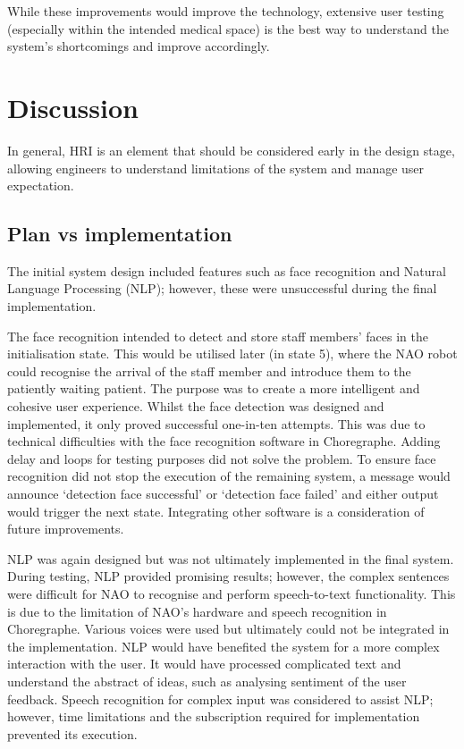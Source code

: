 \documentclass[conference]{IEEEtran}
\begin{document}
While these improvements would improve the technology, extensive user testing (especially within the intended medical space) is the 
best way to understand the system's shortcomings and improve accordingly.


\section{Discussion}
In general, HRI is an element that should be considered early in the design stage, allowing engineers to understand limitations of the system and manage user expectation.
\subsection{Plan vs implementation}

The initial system design included features such as face recognition and Natural Language Processing (NLP); however, these were unsuccessful during the final implementation. 

The face recognition intended to detect and store staff members' faces in the initialisation state. This would be utilised later (in state 5), where the NAO robot could recognise the arrival of the staff member and introduce them to the patiently waiting patient. The purpose was to create a more intelligent and cohesive user experience. Whilst the face detection was designed and implemented, it only proved successful one-in-ten attempts. This was due to technical difficulties with the face recognition software in Choregraphe. Adding delay and loops for testing purposes did not solve the problem. To ensure face recognition did not stop the execution of the remaining system, a message would announce ‘detection face successful’ or ‘detection face failed’ and either output would trigger the next state. Integrating other software is a consideration of future improvements.

NLP was again designed but was not ultimately implemented in the final system. During testing, NLP provided promising results; however, the complex sentences were difficult for NAO to recognise and perform speech-to-text functionality. This is due to the limitation of NAO’s hardware and speech recognition in Choregraphe. Various voices were used but ultimately could not be integrated in the implementation. NLP would have benefited the system for a more complex interaction with the user. It would have processed complicated text and understand the abstract of ideas, such as analysing sentiment of the user feedback. Speech recognition for complex input was considered to assist NLP; however, time limitations and the subscription required for implementation prevented its execution.
\end{document}
